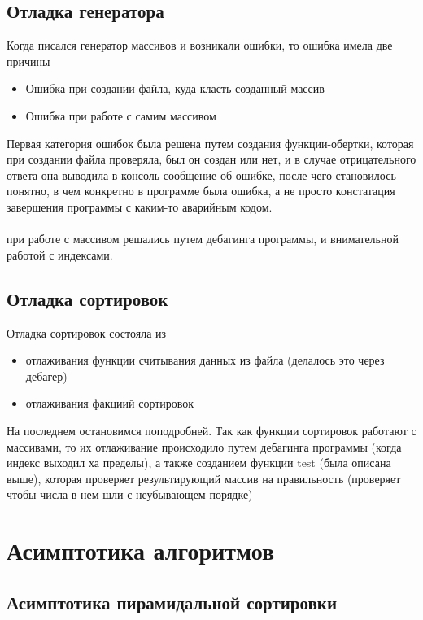 \documentclass[a4paper,12pt,titlepage,finall]{article}
\begin{document}
\subsection{Отладка генератора}

Когда писался генератор массивов и возникали ошибки, то ошибка имела две причины
\begin{itemize}
    \item Ошибка при создании файла, куда класть созданный массив
    \item Ошибка при работе с самим массивом
\end{itemize}

Первая категория ошибок была решена путем создания функции-обертки, которая
при создании файла проверяла, был он создан или нет, и в случае отрицательного ответа она
выводила в консоль сообщение об ошибке, после чего становилось понятно, в чем конкретно 
в программе была ошибка, а не просто констатация завершения программы с каким-то аварийным кодом.
\\
\\
 при работе с массивом решались путем дебагинга программы,
и внимательной работой с индексами.

\subsection{Отладка сортировок}

Отладка сортировок состояла из 
\begin{itemize}
    \item отлаживания функции считывания данных из файла (делалось это через дебагер)
    \item отлаживания факциий сортировок
\end{itemize}

На последнем остановимся поподробней. Так как функции сортировок работают с массивами, то
их отлаживание происходило путем дебагинга программы (когда индекс выходил ха пределы),
а также созданием функции test (была описана выше), которая проверяет результирующий массив на 
правильность (проверяет чтобы числа в нем шли с неубывающем порядке)


\newpage

\section{Асимптотика алгоритмов}

\subsection{Асимптотика пирамидальной сортировки}
\end{document}
